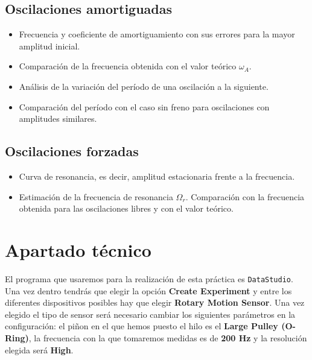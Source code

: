 \documentclass[11pt]{articulo}
\begin{document}
\subsection*{Oscilaciones amortiguadas}

\begin{itemize}

\item{Frecuencia y coeficiente de amortiguamiento con sus errores para la mayor amplitud inicial.}
\item{Comparaci\'on de la frecuencia obtenida con el valor te\'orico $\omega_A$.}
\item{An\'alisis de la variaci\'on del per\'iodo de una oscilaci\'on a la siguiente.}
\item{Comparaci\'on del per\'iodo con el caso sin freno para oscilaciones con amplitudes similares.}

\end{itemize}

\subsection*{Oscilaciones forzadas}

\begin{itemize}

\item{Curva de resonancia, es decir, amplitud estacionaria frente a la frecuencia.}
\item{Estimaci\'on de la frecuencia de resonancia $\Omega_r$. Comparaci\'on con la frecuencia obtenida para las oscilaciones libres y con el valor te\'orico.}

\end{itemize}


\section*{Apartado t\'ecnico}

El programa que usaremos para la realizaci\'on de esta pr\'actica es {\tt DataStudio}. Una vez dentro tendr\'as que elegir la opci\'on {\bf Create Experiment} y entre los diferentes dispositivos posibles hay que elegir {\bf Rotary Motion Sensor}. Una vez elegido el tipo de sensor ser\'a necesario cambiar los siguientes par\'ametros en la configuraci\'on: el pi\~non en el que hemos puesto el hilo es el {\bf Large Pulley (O-Ring)}, la frecuencia con la que tomaremos medidas es de {\bf 200 Hz} y la resoluci\'on elegida ser\'a {\bf High}.
\end{document}
